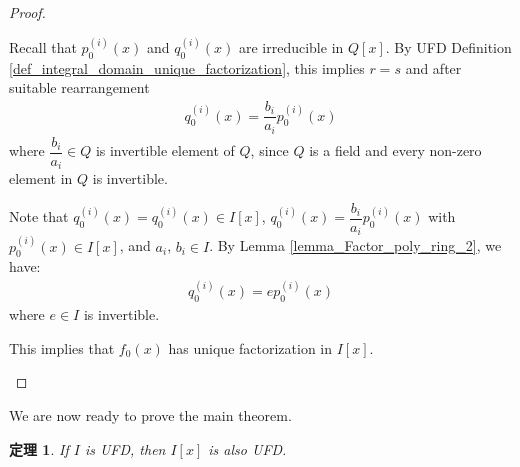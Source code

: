 \documentclass[utf8]{ctexbook}
\newtheorem{theorem}{定理}[section]
\begin{document}
\begin{proof}
\begin{enumerate}
{Recall that $p_0 ^{(i)} (x)$ and $q_0 ^{(i)} (x)$ are irreducible in $Q[x]$. By UFD Definition \ref{def_integral_domain_unique_factorization}, this implies $r =s$ and after suitable rearrangement
\begin{align*}
q_0 ^{(i)} (x) = \dfrac{b_i}{a_i} p_0 ^{(i)} (x)
\end{align*}
where $\dfrac{b_i}{a_i} \in Q$ is invertible element of $Q$, since $Q$ is a field and every non-zero element in $Q$ is invertible.

Note that $q_0 ^{(i)} (x) = q_0 ^{(i)} (x) \in I[x]$, $q_0 ^{(i)} (x) = \dfrac{b_i}{a_i} p_0 ^{(i)} (x)$ with $p_0 ^{(i)} (x) \in I[x]$, and $a_i$, $b_i \in I$. By Lemma \ref{lemma_Factor_poly_ring_2}, we have:
\begin{align*}
q_0 ^{(i)} (x) = e p_0 ^{(i)} (x)
\end{align*}
where $e \in I$ is invertible.

This implies that $f_0 (x)$ has unique factorization in $I[x]$.
}
\end{enumerate}


\end{proof}

We are now ready to prove the main theorem.

\begin{theorem}
\label{theorem_Factor_poly_ring_1}
If $I$ is UFD, then $I[x]$ is also UFD.
\end{theorem}
\end{document}
